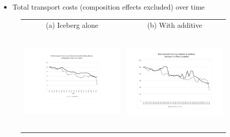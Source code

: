 \documentclass[10 pt,Helvetica, french]{beamer}
\begin{document}
\begin{frame}
\begin{itemize}
\item Total transport costs (composition effects excluded) over time
\end{itemize}
\begin{figure}[htbp]
\begin{center}
\begin{tabular}{cc}
{\scriptsize (a) Iceberg alone } & {\scriptsize  (b) With additive }\\
\includegraphics[width=5cm, height=5cm]{Fig3a_TC_overtime_comp_effects_excl.pdf}
& \includegraphics[width=5cm,height=5cm]{TC_addplusmult_compeffects_excl.pdf} \\
\end{tabular}
\end{center}
\end{figure}

\end{frame}
\end{document}
